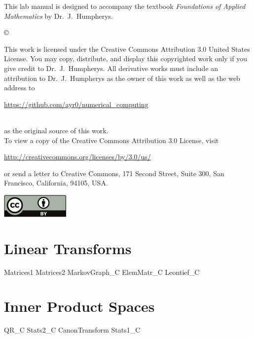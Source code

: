 \documentclass{newsiambook}
\begin{document}

\begin{thepreface}
This lab manual is designed to accompany the textbook \emph{Foundations of Applied Mathematics} by Dr.~J.~Humpherys.

\vfill
\copyright{This work is licensed under the Creative Commons Attribution 3.0 United States 
License.  You may copy, distribute, and display this copyrighted work only if you give 
credit to Dr.~J.~Humpherys. All derivative works must include an attribution to Dr.~J.~Humpherys as the owner of this work as well as the web address to 
\\\centerline{\url{https://github.com/ayr0/numerical_computing}}\\ as the original source of 
this 
work.\\To view a copy of the Creative Commons Attribution 3.0 License, 
visit\\\centerline{\url{http://creativecommons.org/licenses/by/3.0/us/}} or send a letter to 
Creative Commons, 171 Second Street, Suite 300, San Francisco, California, 94105, USA.}

\vfill
\centering\includegraphics[height=1.2cm]{by}
\vfill
\end{thepreface}

\setcounter{tocdepth}{1}
\tableofcontents

\mainmatter

\part{Linear Transforms}
{Matrices1}
{Matrices2}
{MarkovGraph_C}
{ElemMatr_C}
{Leontief_C}

\part{Inner Product Spaces}
{QR_C}
{Stats2_C}
{CanonTransform} 
{Stats1_C}
\end{document}

